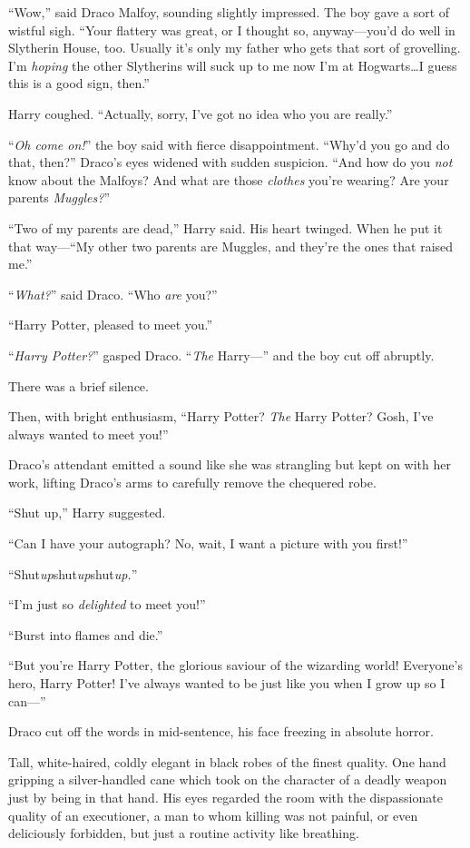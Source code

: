 “Wow,” said Draco Malfoy, sounding slightly impressed. The boy gave a sort of wistful sigh.
“Your flattery was great, or I thought so, anyway—you’d do well in Slytherin House, too. Usually it’s only my father who gets that sort of grovelling. I’m \emph{hoping} the other Slytherins will suck up to me now I’m at Hogwarts…I guess this is a good sign, then.”

Harry coughed.
“Actually, sorry, I’ve got no idea who you are really.”

“\emph{Oh come on!}” the boy said with fierce disappointment.
“Why’d you go and do that, then?” Draco’s eyes widened with sudden suspicion.
“And how do you \emph{not} know about the Malfoys? And what are those \emph{clothes} you’re wearing? Are your parents \emph{Muggles?}”

“Two of my parents are dead,” Harry said. His heart twinged. When he put it that way—“My other two parents are Muggles, and they’re the ones that raised me.”

“\emph{What?}” said Draco.
“Who \emph{are} you?”

“Harry Potter, pleased to meet you.”

“\emph{Harry Potter?}” gasped Draco. “\emph{The} Harry—” and the boy cut off abruptly.

There was a brief silence.

Then, with bright enthusiasm,
“Harry Potter? \emph{The} Harry Potter? Gosh, I’ve always wanted to meet you!”

Draco’s attendant emitted a sound like she was strangling but kept on with her work, lifting Draco’s arms to carefully remove the chequered robe.

“Shut up,” Harry suggested.

“Can I have your autograph? No, wait, I want a picture with you first!”

“Shut\emph{up}shut\emph{up}shut\emph{up.}”

“I’m just so \emph{delighted} to meet you!”

“Burst into flames and die.”

“But you’re Harry Potter, the glorious saviour of the wizarding world! Everyone’s hero, Harry Potter! I’ve always wanted to be just like you when I grow up so I can—”

Draco cut off the words in mid-sentence, his face freezing in absolute horror.

Tall, white-haired, coldly elegant in black robes of the finest quality. One hand gripping a silver-handled cane which took on the character of a deadly weapon just by being in that hand. His eyes regarded the room with the dispassionate quality of an executioner, a man to whom killing was not painful, or even deliciously forbidden, but just a routine activity like breathing.

